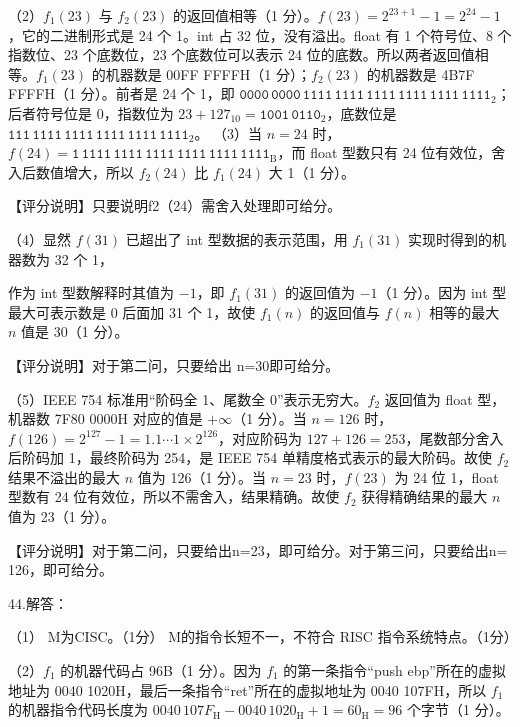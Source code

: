 \documentclass[UTF8,11pt]{ctexart}
\begin{document}
（2）\(\displaystyle f_1(23)\) 与 \(\displaystyle f_2(23)\) 的返回值相等（1 分）。\(\displaystyle f(23)=2^{23+1}-1=2^{24}-1\)，它的二进制形式是 24 个 1。int 占 32 位，没有溢出。float 有 1 个符号位、8 个指数位、23 个底数位，23 个底数位可以表示 24 位的底数。所以两者返回值相等。\(\displaystyle f_1(23)\) 的机器数是 00FF FFFFH（1 分）；\(\displaystyle f_2(23)\) 的机器数是 4B7F FFFFH（1 分）。前者是 24 个 1，即 \(\displaystyle \mathtt{0000\,0000\,1111\,1111\,1111\,1111\,1111\,1111}_2\)；后者符号位是 0，指数位为 \(\displaystyle 23+127_{10}=\mathtt{1001\,0110}_2\)，底数位是 \(\displaystyle \mathtt{111\,1111\,1111\,1111\,1111\,1111}_2\)。 （3）当 \(\displaystyle n=24\) 时，\(\displaystyle f(24)=\mathtt{1\,1111\,1111\,1111\,1111\,1111\,1111}_{\mathrm B}\)，而 float 型数只有 24 位有效位，舍入后数值增大，所以 \(\displaystyle f_2(24)\) 比 \(\displaystyle f_1(24)\) 大 1（1 分）。


【评分说明】只要说明f2（24）需舍入处理即可给分。


（4）显然 \(\displaystyle f(31)\) 已超出了 int 型数据的表示范围，用 \(\displaystyle f_1(31)\) 实现时得到的机器数为 32 个 1，


作为 int 型数解释时其值为 \(\displaystyle -1\)，即 \(\displaystyle f_1(31)\) 的返回值为 \(\displaystyle -1\)（1 分）。因为 int 型最大可表示数是 0 后面加 31 个 1，故使 \(\displaystyle f_1(n)\) 的返回值与 \(\displaystyle f(n)\) 相等的最大 \(\displaystyle n\) 值是 30（1 分）。


【评分说明】对于第二问，只要给出 n=30即可给分。


（5）IEEE 754 标准用“阶码全 1、尾数全 0”表示无穷大。\(\displaystyle f_2\) 返回值为 float 型，机器数 7F80 0000H 对应的值是 \(\displaystyle +\infty\)（1 分）。当 \(\displaystyle n=126\) 时，\(\displaystyle f(126)=2^{127}-1=1.1\cdots1\times2^{126}\)，对应阶码为 \(\displaystyle 127+126=253\)，尾数部分舍入后阶码加 1，最终阶码为 254，是 IEEE 754 单精度格式表示的最大阶码。故使 \(\displaystyle f_2\) 结果不溢出的最大 \(\displaystyle n\) 值为 126（1 分）。当 \(\displaystyle n=23\) 时，\(\displaystyle f(23)\) 为 24 位 1，float 型数有 24 位有效位，所以不需舍入，结果精确。故使 \(\displaystyle f_2\) 获得精确结果的最大 \(\displaystyle n\) 值为 23（1 分）。


【评分说明】对于第二问，只要给出n=23，即可给分。对于第三问，只要给出n= 126，即可给分。


44.解答：


（1） M为CISC。（1分） M的指令长短不一，不符合 RISC 指令系统特点。（1分）


（2）\(\displaystyle f_1\) 的机器代码占 96B（1 分）。因为 \(\displaystyle f_1\) 的第一条指令“push ebp”所在的虚拟地址为 0040 1020H，最后一条指令“ret”所在的虚拟地址为 0040 107FH，所以 \(\displaystyle f_1\) 的机器指令代码长度为 \(\displaystyle 0040\,107F_{\mathrm H}-0040\,1020_{\mathrm H}+1=60_{\mathrm H}=96\) 个字节（1 分）。
\end{document}
